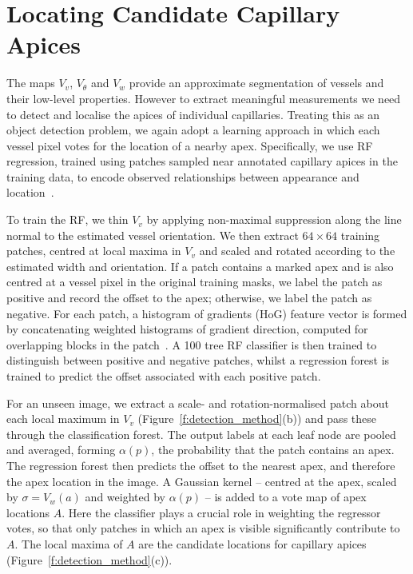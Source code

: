 \documentclass[runningheads,a4paper]{llncs}
\newcommand{\fref}[1]{Figure~\ref{#1}}
\begin{document}
\section{Locating Candidate Capillary Apices}
\label{s:capillary_apexes}

The maps $V_v$, $V_\theta$ and $V_w$ provide an approximate segmentation of vessels and their low-level properties. However to extract meaningful measurements we need to detect and localise the apices of individual capillaries. Treating this as an object detection problem, we again adopt a learning approach in which each vessel pixel votes for the location of a nearby apex. Specifically, we use RF regression, trained using patches sampled near annotated capillary apices in the training data, to encode observed relationships between appearance and location~\cite{Criminisi_MICCAI11}.%

To train the RF, we thin $V_v$ by applying non-maximal suppression along the line normal to the estimated vessel orientation. We then extract $64 \times 64$ training patches, centred at local maxima in $V_v$ and scaled and rotated according to the estimated width and orientation. If a patch contains a marked apex and is also centred at a vessel pixel in the original training masks, we label the patch as positive and record the offset to the apex; otherwise, we label the patch as negative. %
For each patch, a histogram of gradients (HoG) feature vector is formed by concatenating weighted histograms of gradient direction, computed for overlapping blocks in the patch~\cite{Dalal_Triggs_CVPR05}. A 100 tree RF classifier is then trained to distinguish between positive and negative patches, whilst a regression forest is trained to predict the offset associated with each positive patch.

For an unseen image, we extract a scale- and rotation-normalised patch about each local maximum in $V_v$ (\fref{f:detection_method}(b)) and pass these through the classification forest. The output labels at each leaf node are pooled and averaged, forming $\alpha(p)$, the probability that the patch contains an apex. The regression forest then predicts the offset to the nearest apex, and therefore the apex location in the image. A Gaussian kernel -- centred at the apex, scaled by $\sigma = V_w(a)$ and weighted by $\alpha(p)$ -- is added to a vote map of apex locations $A$. Here the classifier plays a crucial role in weighting the regressor votes, so that only patches in which an apex is visible significantly contribute to $A$.%
The local maxima of $A$ are the candidate locations for capillary apices (\fref{f:detection_method}(c)).
%
\end{document}
